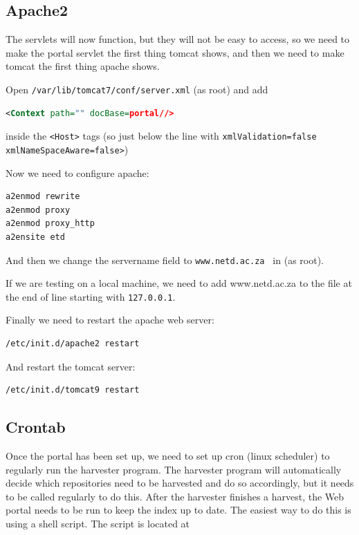 \documentclass[a4paper,11pt]{article}
\begin{document}
\subsection{Apache2}
\label{sec:installation_process:apache2}

The servlets will now function, but they will not be easy to access, so we need to make the portal servlet the first thing tomcat shows, and then we need to make tomcat the first thing apache shows.

Open \texttt{/var/lib/tomcat7/conf/server.xml} (as root) and add 

\begin{lstlisting}[language=XML]
<Context path="" docBase=portal//> 
\end{lstlisting}

inside the \texttt{<Host>} tags (so just below the line with \texttt{xmlValidation=false xmlNameSpaceAware=false>})

Now we need to configure apache: 

\begin{lstlisting}[language=bash]
a2enmod rewrite 
a2enmod proxy 
a2enmod proxy_http 
a2ensite etd
\end{lstlisting}

And then we change the servername field to \texttt{www.netd.ac.za } in  (as root).

If we are testing on a local machine, we need to add www.netd.ac.za to the  file at the end of line starting with \texttt{127.0.0.1}.

Finally we need to restart the apache web server: 

\begin{lstlisting}[language=bash]
/etc/init.d/apache2 restart
\end{lstlisting}

And restart the tomcat server: 

\begin{lstlisting}[language=bash]
/etc/init.d/tomcat9 restart
\end{lstlisting}

\subsection{Crontab}
\label{sec:installation_process:crontab}

Once the portal has been set up, we need to set up cron (linux scheduler) to regularly run the harvester program. The harvester program will automatically decide which repositories need to be harvested and do so accordingly, but it needs to be called regularly to do this. After the harvester finishes a harvest, the Web portal needs to be run to keep the index up to date. The easiest way to do this is using a shell script. The script is located at 
\end{document}
